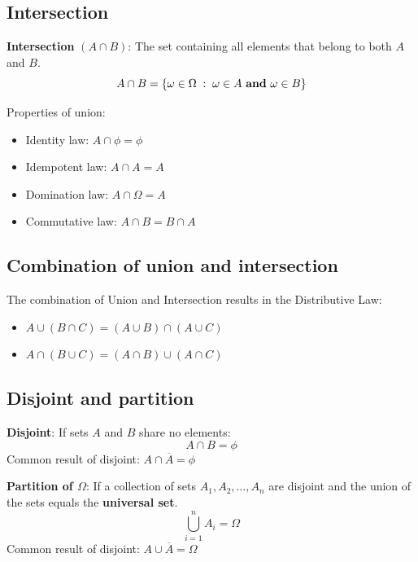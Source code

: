 \documentclass[10pt,a4paper]{article}
\begin{document}
\subsection{Intersection}

\begin{tcolorbox}[breakable,colback=white]
\textbf{Intersection} $(A \cap B)$: The set containing all elements that
belong to both $A$ and $B$.
$$
    A \cap B = \left\{\omega \in \Omega\; : \; \omega \in A \text{ \textbf{and} }\omega \in B\right\}
$$
\end{tcolorbox}

Properties of union:
\begin{itemize}
    \item Identity law: $A\cap \phi = \phi$
    \item Idempotent law: $A \cap A = A$
    \item Domination law: $A \cap \Omega = A$
    \item Commutative law: $A\cap B = B \cap A$
\end{itemize}

\subsection{Combination of union and intersection}

The combination of Union and Intersection results in the Distributive Law:
\begin{itemize}
    \item $A \cup(B\cap C)=(A\cup B)\cap (A\cup C)$
    \item $A \cap (B \cup C) = (A\cap B) \cup (A\cap C)$ 
\end{itemize}

\subsection{Disjoint and partition}

\textbf{Disjoint}: If sets $A$ and $B$ share no elements: 
$$
    A \cap B = \phi
$$
Common result of disjoint: $A \cap \overline{A} = \phi$

\textbf{Partition of $\Omega$}: If a collection of sets $A_1,A_2,\dots,A_n$ are disjoint and the
union of the sets equals the \textbf{universal set}.
$$
    \bigcup_{i=1}^n A_i = \Omega
$$
Common result of disjoint: $A \cup \overline{A} = \Omega$
\end{document}
